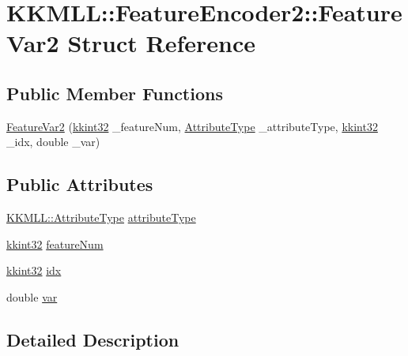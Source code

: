 \hypertarget{struct_feature_encoder2_1_1_feature_var2}{}\section{K\+K\+M\+LL\+:\+:Feature\+Encoder2\+:\+:Feature\+Var2 Struct Reference}
\label{struct_feature_encoder2_1_1_feature_var2}
\subsection*{Public Member Functions}
\begin{DoxyCompactItemize}
\item 
\hyperlink{struct_feature_encoder2_1_1_feature_var2_ae879932315eaa281614e4223ffe35d74}{Feature\+Var2} (\hyperlink{namespace_k_k_b_a8fa4952cc84fda1de4bec1fbdd8d5b1b}{kkint32} \+\_\+feature\+Num, \hyperlink{namespace_k_k_m_l_l_a99973706982b59debba670e2480555ab}{Attribute\+Type} \+\_\+attribute\+Type, \hyperlink{namespace_k_k_b_a8fa4952cc84fda1de4bec1fbdd8d5b1b}{kkint32} \+\_\+idx, double \+\_\+var)
\end{DoxyCompactItemize}
\subsection*{Public Attributes}
\begin{DoxyCompactItemize}
\item 
\hyperlink{namespace_k_k_m_l_l_a99973706982b59debba670e2480555ab}{K\+K\+M\+L\+L\+::\+Attribute\+Type} \hyperlink{struct_feature_encoder2_1_1_feature_var2_ad657d80ae265a387fdeb63dfd67cd695}{attribute\+Type}
\item 
\hyperlink{namespace_k_k_b_a8fa4952cc84fda1de4bec1fbdd8d5b1b}{kkint32} \hyperlink{struct_feature_encoder2_1_1_feature_var2_a66b3143d8e17e3f206d41c2c79b43bc3}{feature\+Num}
\item 
\hyperlink{namespace_k_k_b_a8fa4952cc84fda1de4bec1fbdd8d5b1b}{kkint32} \hyperlink{struct_feature_encoder2_1_1_feature_var2_aed5328bcecddd127ab569227fcf7a754}{idx}
\item 
double \hyperlink{struct_feature_encoder2_1_1_feature_var2_a6d42ea33b0c3ca09fab67f5ed85dc172}{var}
\end{DoxyCompactItemize}


\subsection{Detailed Description}


